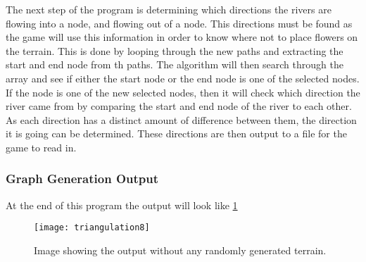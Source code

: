 	The next step of the program is determining which directions the rivers are flowing into a node, and flowing out of a node. This directions must be found as the game will use this information in order to know where not to place flowers on the terrain. This is done by looping through the new paths and extracting the start and end node from th paths. The algorithm will then search through the array and see if either the start node or the end node is one of the selected nodes. If the node is one of the new selected nodes, then it will check which direction the river came from by comparing the start and end node of the river to each other. As each direction has a distinct amount of difference between them, the direction it is going can be determined. These directions are then output to a file for the game to read in.\\

\subsubsection{Graph Generation Output}

	At the end of this program the output will look like \ref{fig:triangulation8}

\newpage

\begin{figure}[H]
	\texttt{[image: triangulation8]}
	\centering
	\caption{Image showing the output without any randomly generated terrain.}
	\label{fig:triangulation8}
\end{figure}


